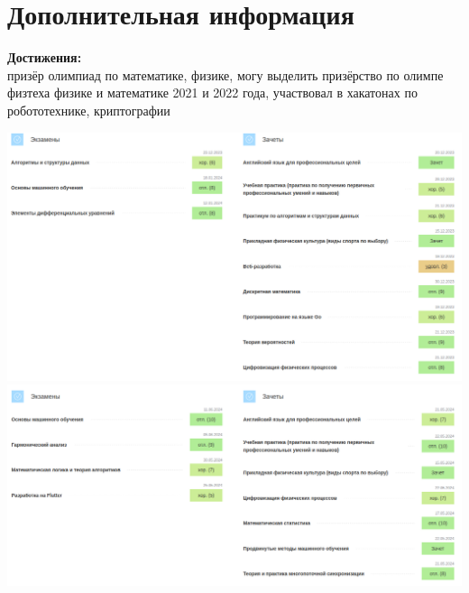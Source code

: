 \documentclass[a4paper,10pt]{article}
\begin{document}
\section*{Дополнительная информация}
\noindent
\textbf{Достижения:} \\ призёр олимпиад по математике, физике, могу выделить призёрство по олимпе физтеха физике и математике 2021 и 2022 года, участвовал в хакатонах по робототехнике, криптографии


\begin{center}
  \includegraphics[scale = 0.5]{pic1.png}
  \includegraphics[scale = 0.5]{pic2.png}
\end{center}
\end{document}
